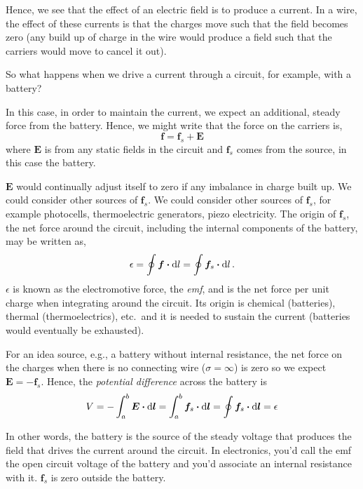 \documentclass[12pt,chapterprefix=false,dvipsnames]{scrbook}
\theoremstyle{dotless}
\theoremstyle{definition}
\begin{document}
Hence, we see that the effect of an electric field is to produce
a current. In a wire, the effect of these currents is that the
charges move such that the field becomes zero (any build up of
charge in the wire would produce a field such that the carriers
would move to cancel it out).

So what happens when we drive a current through a circuit, for
example, with a battery?

In this case, in order to maintain the current, we expect an
additional, steady force from the battery. Hence, we might write
that the force on the carriers is,
\begin{equation}
	\bm{f} = \bm{f}_s +
	\bm{E}
\end{equation}
where $\bm{E}$ is from any static fields in the
circuit and $\bm{f}_s$ comes from the source, in
this case the battery.

$\bm{E}$ would continually adjust itself to zero
if any imbalance in charge built up. We could consider other
sources of $\bm{f}_s$. We could consider other
sources of $\bm{f}_s$, for example photocells,
thermoelectric generators, piezo electricity. The origin of
$\bm{f}_s$, the net force around the circuit,
including the internal components of the battery, may be written
as,
\begin{equation}
	\epsilon = \oint
	\bm{f}\vdot\dd{l} = \oint
	\bm{f}_s\vdot\dd{l}.
\end{equation}
$\epsilon$ is known as the electromotive force, the
\textit{emf}, and is the net force per unit charge
when integrating around the circuit. Its origin is chemical
(batteries), thermal (thermoelectrics), etc.\ and it is needed
to sustain the current (batteries would eventually be
exhausted).

For an idea source, e.g., a battery without internal resistance,
the net force on the charges when there is no connecting wire
($\sigma = \infty$) is zero so we expect
$\bm{E} = -\bm{f}_s$. Hence, the \textit{potential difference}
across the battery is
\begin{equation}
	V =
	-\int_{a}^{b}\bm{E}\vdot\dd{\bm{l}}
	=
	\int_{a}^{b}\bm{f}_s\vdot\dd{\bm{l}}
	= \oint\bm{f}_{s}\vdot\dd{\bm{l}} =
	\epsilon
\end{equation}

In other words, the battery is the source of the steady voltage
that produces the field that drives the current around the
circuit. In electronics, you'd call the emf the open circuit
voltage of the battery and you'd associate an internal
resistance with it. $\bm{f}_s$ is zero outside the
battery.
\end{document}
